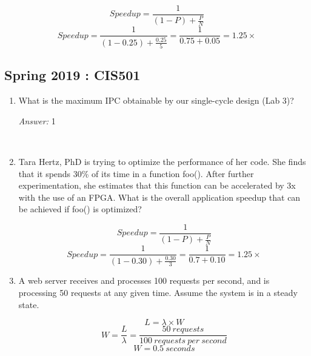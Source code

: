 \documentclass[12pt]{article}
\newenvironment{QandA}{\begin{enumerate}[label=\bfseries\alph*.]\bfseries}
                      {\end{enumerate}}
\newenvironment{answered}{\par\quad\normalfont}{}
\begin{document}
\begin{QandA}
    \begin{answered}
    \begin{equation*}
    Speedup = \frac{1}{(1-P)+\frac{P}{N}}    
    \end{equation*}
    \begin{equation*}
    Speedup = \frac{1}{(1-0.25)+\frac{0.25}{5}} = \frac{1}{0.75+0.05} = 1.25\times
    \end{equation*}
    \end{answered}

\end{QandA}

\subsection{Spring 2019 : CIS501}

\begin{QandA}
   \item What is the maximum IPC obtainable by our single-cycle design (Lab 3)?
        \begin{answered}
        \textit{Answer:} 1
        \end{answered}
        
    \
        
    \item Tara Hertz, PhD is trying to optimize the performance of her code. She finds that it spends 30\% of its time in a function foo(). After further experimentation, she estimates that this function can be accelerated by 3x with the use of an FPGA. What is the overall application speedup that can be achieved if foo() is optimized?
        \begin{answered}
        \begin{equation*}
        Speedup = \frac{1}{(1-P)+\frac{P}{N}}    
        \end{equation*}
        \begin{equation*}
        Speedup = \frac{1}{(1-0.30)+\frac{0.30}{3}} = \frac{1}{0.7+0.10} = 1.25\times
        \end{equation*}
        \end{answered}
        
    \item A web server receives and processes 100 requests per second, and is processing 50 requests at any given time. Assume the system is in a steady state.
    
    \begin{answered}
    \begin{equation*}
        L = \lambda \times W
    \end{equation*}
    \begin{equation*}
        W = \frac{L}{\lambda} = \frac{50\ requests}{100\ requests\ per\ second}
    \end{equation*}
    \begin{equation*}
        W = 0.5\ seconds
    \end{equation*}
    

\end{answered}
\end{QandA}
\end{document}
